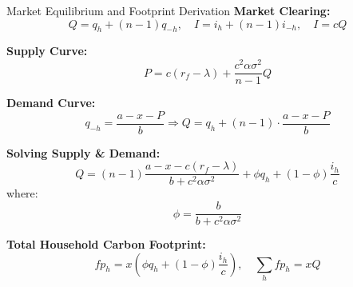 \documentclass{beamer}
\begin{document}
\begin{frame}{Market Equilibrium and Footprint Derivation}
\footnotesize
\vspace{-2.5em}
\textbf{Market Clearing:}
\[
Q = q_h + (n-1)q_{-h}, \quad I = i_h + (n-1)i_{-h}, \quad I = c Q
\]

\pause
\vspace{0.3em}
\textbf{Supply Curve:}
\[
P = c(r_f - \lambda) + \frac{c^2\alpha\sigma^2}{n-1} Q
\]

\vspace{0.3em}
\textbf{Demand Curve:}
\[
q_{-h} = \frac{a - x - P}{b} \Rightarrow Q = q_h + (n - 1)\cdot \frac{a - x - P}{b} 
\]

\pause
\vspace{0.3em}
\textbf{Solving Supply \& Demand:}
\[
Q = (n-1)\frac{a - x - c(r_f - \lambda)}{b + c^2\alpha\sigma^2} + \phi q_h + (1-\phi)\frac{i_h}{c}
\]
where:
\[
\phi = \frac{b}{b + c^2\alpha\sigma^2}
\]

\textbf{Total Household Carbon Footprint:}
\[
fp_h = x\left(\phi q_h + (1-\phi)\frac{i_h}{c}\right), \quad \sum_h fp_h = x Q
\]
\end{frame}
\end{document}
